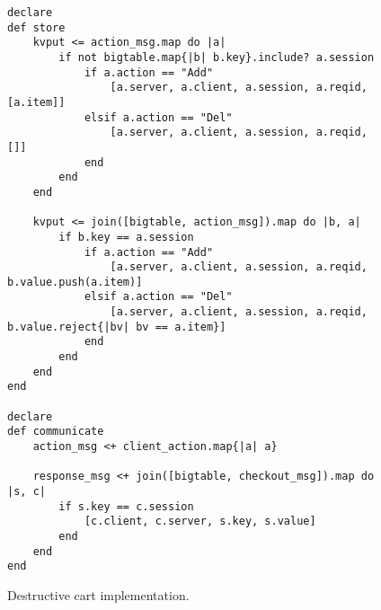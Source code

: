 \begin{comment}
\jmh{Alternative to lines 5--9 is to insert the following rule.  It ``preserves'' the action items that have adds but no deletes ... i.e. the other branch of the left-outer-join.  I think this is easier to explain.}  \jmh{regardless of what you decide, be sure to explain all lines of the program!}
\begin{scriptsize}
\begin{verbatim}
	status <= join(action_cnt, checkout).map do |a, c|
	  if a.action == "Add" and not
	        action_cnt.map{|d| d.id if d.action == "Del" and a.id}.include? a.id
	     [a.session, a.item, a.cnt]
	  end
	end
\end{verbatim}	
\end{scriptsize}
\end{comment}

\begin{figure}[t]
\begin{scriptsize}
\begin{lstlisting}
declare
def store
	kvput <= action_msg.map do |a|
		if not bigtable.map{|b| b.key}.include? a.session
			if a.action == "Add"
				[a.server, a.client, a.session, a.reqid, [a.item]]
			elsif a.action == "Del"
				[a.server, a.client, a.session, a.reqid, []]
			end
		end
	end  

	kvput <= join([bigtable, action_msg]).map do |b, a|
		if b.key == a.session
			if a.action == "Add"
				[a.server, a.client, a.session, a.reqid, b.value.push(a.item)]
			elsif a.action == "Del"
				[a.server, a.client, a.session, a.reqid, b.value.reject{|bv| bv == a.item}]
			end
		end
	end
end

declare
def communicate
	action_msg <+ client_action.map{|a| a}

	response_msg <+ join([bigtable, checkout_msg]).map do |s, c|
		if s.key == c.session
			[c.client, c.server, s.key, s.value]
		end
	end
end
\end{lstlisting}
\vspace{-10pt}
\caption{Destructive cart implementation.}
\label{fig:pdg-destructive}
\vspace{-2pt}
\end{scriptsize}
\end{figure}
